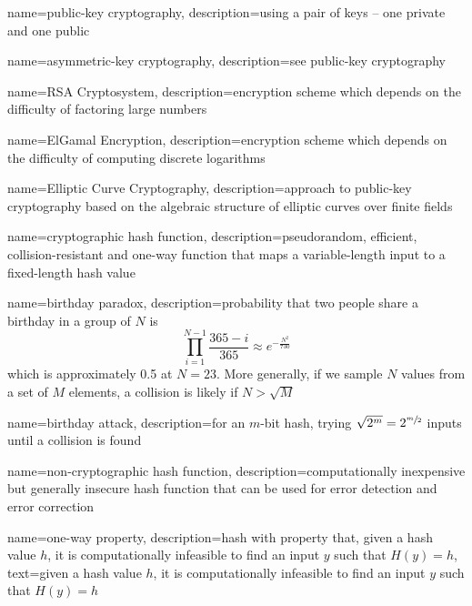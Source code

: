 {
    name={public-key cryptography},
    description={using a pair of keys -- one private and one public}
}

{
    name={asymmetric-key cryptography},
    description={see \gls{public-key cryptography}}
}

{
    name={RSA Cryptosystem},
    description={encryption scheme which depends on the difficulty of factoring large numbers}
}

{
    name={ElGamal Encryption},
    description={encryption scheme which depends on the difficulty of computing discrete logarithms}
}

{
    name={Elliptic Curve Cryptography},
    description={approach to public-key cryptography based on the algebraic structure of elliptic curves over finite fields}
}

{
    name={cryptographic hash function},
    description={pseudorandom, efficient, collision-resistant and one-way function that maps a variable-length input to a fixed-length hash value}
}

{
    name={birthday paradox},
    description={probability that two people share a birthday in a group of $N$ is \[\prod_{i=1}^{N-1}\frac{365 - i}{365} \approx e^{-\frac{N^2}{730}}\] which is approximately 0.5 at $N=23$. More generally, if we sample $N$ values from a set of $M$ elements, a collision is likely if $N > \sqrt{M}$}
}

{
    name={birthday attack},
    description={for an $m$-bit hash, trying $\sqrt{2^m} = 2^{\sfrac{m}{2}}$ inputs until a collision is found}
}

{
    name={non-cryptographic hash function},
    description={computationally inexpensive but generally insecure hash function that can be used for error detection and error correction}
}

{
    name={one-way property},
    description={hash with property that, given a hash value $h$, it is computationally infeasible to find an input $y$ such that $H(y) = h$},
    text={given a hash value $h$, it is computationally infeasible to find an input $y$ such that $H(y) = h$}
}

